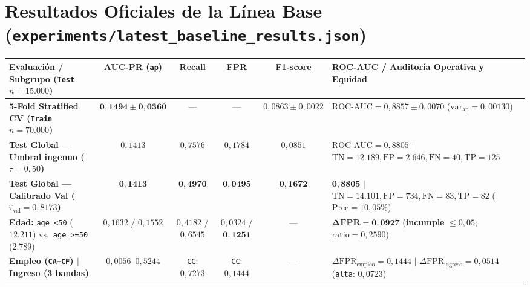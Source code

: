 \documentclass[9pt,letterpaper]{article}
\begin{document}
\section{Resultados Oficiales de la Línea Base (\texttt{experiments/latest\_baseline\_results.json})}
\vspace{1pt}
{\scriptsize
\begin{tabularx}{\textwidth}{@{}l c c c c X@{}}
\toprule
\textbf{Evaluación / Subgrupo (\texttt{Test} $n=15.000$)} & \textbf{AUC-PR (\texttt{ap})} & \textbf{Recall} & \textbf{FPR} & \textbf{F1-score} & \textbf{ROC-AUC / Auditoría Operativa y Equidad} \\
\midrule
\textbf{5-Fold Stratified CV (\texttt{Train} $n=70.000$)} & $\mathbf{0,1494 \pm 0,0360}$ & --- & --- & $0,0863 \pm 0,0022$ & $\text{ROC-AUC}=0,8857\pm 0,0070$ ($\text{var}_{\text{ap}}=0,00130$) \\
\textbf{Test Global --- Umbral ingenuo ($\tau=0,50$)} & $0,1413$ & $0,7576$ & $0,1784$ & $0,0851$ & $\text{ROC-AUC}=0,8805$ $|$ $\text{TN}=12.189, \text{FP}=2.646, \text{FN}=40, \text{TP}=125$ \\
\textbf{Test Global --- Calibrado Val ($\hat{\tau}_{\text{val}}=0,8173$)} & $\mathbf{0,1413}$ & $\mathbf{0,4970}$ & $\mathbf{0,0495}$ & $\mathbf{0,1672}$ & $\mathbf{0,8805}$ $|$ $\text{TN}=14.101, \text{FP}=734, \text{FN}=83, \text{TP}=82$ ($\text{Prec}=10,05\%$) \\
\midrule
\textbf{Edad:} \texttt{age\_<50} ($12.211$) vs.\ \texttt{age\_>=50} ($2.789$) & $0,1632$ / $0,1552$ & $0,4182$ / $0,6545$ & $0,0324$ / $\mathbf{0,1251}$ & --- & $\mathbf{\Delta\text{FPR}=0,0927}$ (\textbf{incumple} $\le 0,05$; $\text{ratio}=0,2590$) \\
\textbf{Empleo (\texttt{CA--CF}) $|$ Ingreso (3 bandas)} & $0,0056\text{--}0,5244$ & \texttt{CC}: $0,7273$ & \texttt{CC}: $0,1444$ & --- & $\Delta\text{FPR}_{\text{empleo}}=0,1444$ $|$ $\Delta\text{FPR}_{\text{ingreso}}=0,0514$ (\texttt{alta}: $0,0723$) \\
\bottomrule
\end{tabularx}
}
\end{document}
